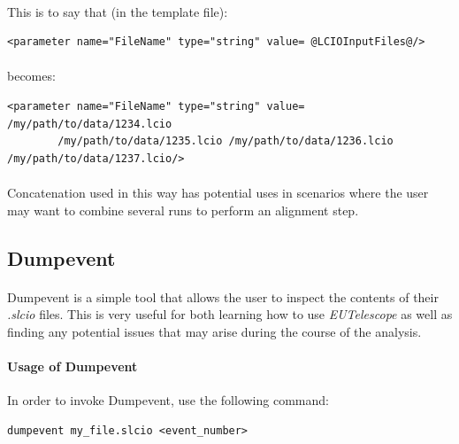 \documentclass[11pt]{article}
\begin{document}
\paragraph{}
This is to say that (in the template file):
\begin{verbatim}
<parameter name="FileName" type="string" value= @LCIOInputFiles@/>
\end{verbatim}
\paragraph{}
becomes:
\begin{verbatim}
<parameter name="FileName" type="string" value= /my/path/to/data/1234.lcio 
        /my/path/to/data/1235.lcio /my/path/to/data/1236.lcio /my/path/to/data/1237.lcio/>
\end{verbatim}
\paragraph{}
Concatenation used in this way has potential uses in scenarios where the user may want to combine several runs to perform an alignment step.
\subsection{Dumpevent}
\paragraph{}
Dumpevent is a simple tool that allows the user to inspect the contents of their \textit{.slcio} files. This is very useful for both learning how to use \textit{EUTelescope} as well as finding any potential issues that may arise during the course of the analysis.
\paragraph{Usage of Dumpevent}
In order to invoke Dumpevent, use the following command:
\begin{verbatim}
dumpevent my_file.slcio <event_number>
\end{verbatim}
\end{document}
